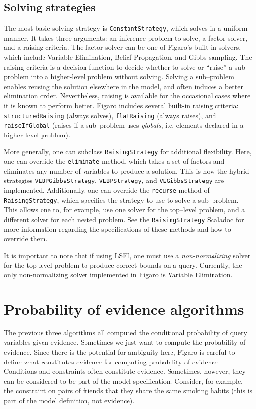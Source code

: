 \subsection{Solving strategies}

The most basic solving strategy is \texttt{ConstantStrategy}, which solves in a uniform manner. It takes three arguments: an inference problem to solve, a factor solver, and a raising criteria. The factor solver can be one of Figaro's built in solvers, which include Variable Elimination, Belief Propagation, and Gibbs sampling. The raising criteria is a decision function to decide whether to solve or ``raise'' a sub--problem into a higher-level problem without solving. Solving a sub--problem enables reusing the solution elsewhere in the model, and often induces a better elimination order. Nevertheless, raising is available for the occasional cases where it is known to perform better. Figaro includes several built-in raising criteria: \texttt{structuredRaising} (always solves), \texttt{flatRaising} (always raises), and \texttt{raiseIfGlobal} (raises if a sub--problem uses \textit{globals}, i.e. elements declared in a higher-level problem).

More generally, one can subclass \texttt{RaisingStrategy} for additional flexibility. Here, one can override the \texttt{eliminate} method, which takes a set of factors and eliminates any number of variables to produce a solution. This is how the hybrid strategies \texttt{VEBPGibbsStrategy}, \texttt{VEBP\-Strategy}, and \texttt{VEGibbsStrategy} are implemented. Additionally, one can override the \texttt{recurse} method of \texttt{RaisingStrategy}, which specifies the strategy to use to solve a sub--problem. This allows one to, for example, use one solver for the top--level problem, and a different solver for each nested problem. See the \texttt{RaisingStrategy} Scaladoc for more information regarding the specifications of these methods and how to override them.

It is important to note that if using LSFI, one must use a \textit{non-normalizing} solver for the top-level problem to produce correct bounds on a query. Currently, the only non-normalizing solver implemented in Figaro is Variable Elimination.

\section{Probability of evidence algorithms}

The previous three algorithms all computed the conditional probability of query variables given evidence. Sometimes we just want to compute the probability of evidence. Since there is the potential for ambiguity here, Figaro is careful to define what constitutes evidence for computing probability of evidence. Conditions and constraints often constitute evidence. Sometimes, however, they can be considered to be part of the model specification. Consider, for example, the constraint on pairs of friends that they share the same smoking habits (this is part of the model definition, not evidence).

